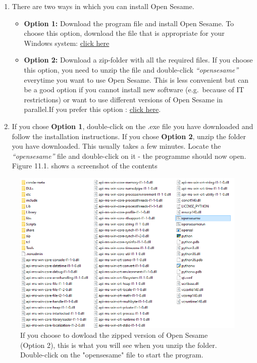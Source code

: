 \documentclass[
]{book}
\providecommand{\tightlist}{%
  \setlength{\itemsep}{0pt}\setlength{\parskip}{0pt}}
\begin{document}
\begin{enumerate}
\def\labelenumi{\arabic{enumi}.}
\tightlist
\item
  There are two ways in which you can install Open Sesame.

  \begin{itemize}
  \tightlist
  \item
    \textbf{Option 1:} Download the program file and install Open Sesame. To choose this option, download the file that is appropriate for your Windows system: \href{https://github.com/open-cogsci/OpenSesame/releases/download/release\%2F3.3.2/opensesame_3.3.2-py27-win64-1.exe}{click here}
  \item
    \textbf{Option 2:} Download a zip-folder with all the required files. If you choose this option, you need to unzip the file and double-click \emph{``opensesame''} everytime you want to use Open Sesame. This is less convenient but can be a good option if you cannot install new software (e.g.~because of IT restrictions) or want to use different versions of Open Sesame in parallel.If you prefer this option : \href{https://github.com/open-cogsci/OpenSesame/releases/download/release\%2F3.3.2/opensesame_3.3.2-py27-win64-1.zip}{click here}.
  \end{itemize}
\item
  If you chose \textbf{Option 1}, double-click on the .exe file you have downloaded and follow the installation instructions. If you chose \textbf{Option 2}, unzip the folder you have downloaded. This usually takes a few minutes. Locate the \emph{``opensesame''} file and double-click on it - the programme should now open. Figure 11.1. shows a screenshot of the contents
\end{enumerate}

\begin{figure}

{\centering \includegraphics[width=0.85\linewidth]{images/opensesame/Option2} 

}

\caption{If you choose to dowload the zipped version of Open Sesame (Option 2), this is what you will see when you unzip the folder. Double-click on the "opensesame" file to start the program.}\label{fig:Figure12-1}
\end{figure}
\end{document}
